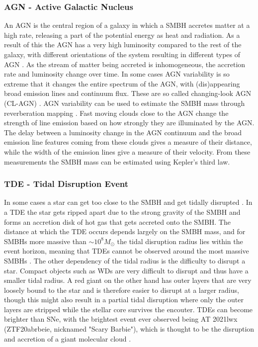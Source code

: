 \documentclass[a4paper,oneside,12pt, class=Latex/Classes/PhDthesisPSnPDF, crop=false]{standalone}
\begin{document}
\subsubsection{AGN - Active Galactic Nucleus}
An AGN is the central region of a galaxy in which a SMBH accretes matter at a high rate, releasing a part of the potential energy as heat and radiation. As a result of this the AGN has a very high luminosity compared to the rest of the galaxy, with different orientations of the system resulting in different types of AGN \citep{Antonucci_1993_AGN, Urry_1995_AGN}. As the stream of matter being accreted is inhomogeneous, the accretion rate and luminosity change over time. In some cases AGN variability is so extreme that it changes the entire spectrum of the AGN, with (dis)appearing broad emission lines and continuum flux. These are so called changing-look AGN (CL-AGN) \citep[see][for a review]{CLAGN}. AGN variability can be used to estimate the SMBH mass through reverberation mapping \citep{Reverberation_mapping, Reverberation_Peterson}. Fast moving clouds close to the AGN change the strength of line emission based on how strongly they are illuminated by the AGN. The delay between a luminosity change in the AGN continuum and the broad emission line features coming from these clouds gives a measure of their distance, while the width of the emission lines give a measure of their velocity. From these measurements the SMBH mass can be estimated using Kepler's third law.


\subsubsection{TDE - Tidal Disruption Event}
In some cases a star can get too close to the SMBH and get tidally disrupted \citep{Rees_1988_TDE, Strubbe_2009_TDE}. In a TDE the star gets ripped apart due to the strong gravity of the SMBH and forms an accretion disk of hot gas that gets accreted onto the SMBH. The distance at which the TDE occurs depends largely on the SMBH mass, and for SMBHs more massive than $\sim10^8 M_\odot$ the tidal disruption radius lies within the event horizon, meaning that TDEs cannot be observed around the most massive SMBHs \citep{Hills_mass}. The other dependency of the tidal radius is the difficulty to disrupt a star. Compact objects such as WDs are very difficult to disrupt and thus have a smaller tidal radius. A red giant on the other hand has outer layers that are very loosely bound to the star and is therefore easier to disrupt at a larger radius, though this might also result in a partial tidal disruption where only the outer layers are stripped while the stellar core survives the encouter. TDEs can become brighter than SNe, with the brightest event ever observed being AT 2021lwx (ZTF20abrbeie, nicknamed "Scary Barbie"), which is thought to be the disruption and accretion of a giant molecular cloud \citep{Scary_Barbie, 2021lwx_Wiseman}.
\end{document}
